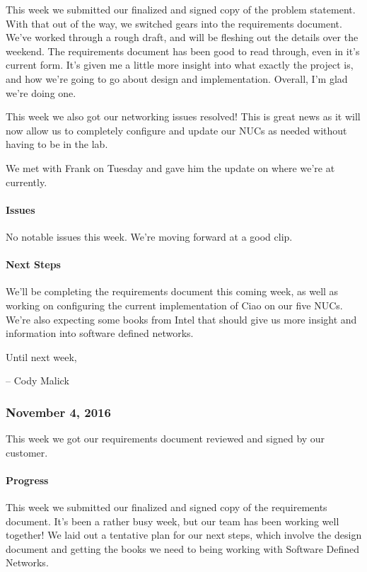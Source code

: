 \documentclass[10pt,onecolumn,journal,draftclsnofoot]{IEEEtran}
\begin{document}
This week we submitted our finalized and signed copy of the problem
statement. With that out of the way, we switched gears into the
requirements document. We've worked through a rough draft, and will be
fleshing out the details over the weekend. The requirements document has
been good to read through, even in it's current form. It's given me a
little more insight into what exactly the project is, and how we're
going to go about design and implementation. Overall, I'm glad we're
doing one.

This week we also got our networking issues resolved! This is great news
as it will now allow us to completely configure and update our NUCs as
needed without having to be in the lab.

We met with Frank on Tuesday and gave him the update on where we're at
currently.

\paragraph{Issues} 

No notable issues this week. We're moving forward at a good clip.

\paragraph{Next Steps} 

We'll be completing the requirements document this coming week, as well
as working on configuring the current implementation of Ciao on our five
NUCs. We're also expecting some books from Intel that should give us
more insight and information into software defined networks.

Until next week,

-- Cody Malick

\subsubsection{November 4, 2016} 

This week we got our requirements document reviewed and signed by our
customer.

\paragraph{Progress} 

This week we submitted our finalized and signed copy of the requirements
document. It's been a rather busy week, but our team has been working
well together! We laid out a tentative plan for our next steps, which
involve the design document and getting the books we need to being
working with Software Defined Networks.
\end{document}
